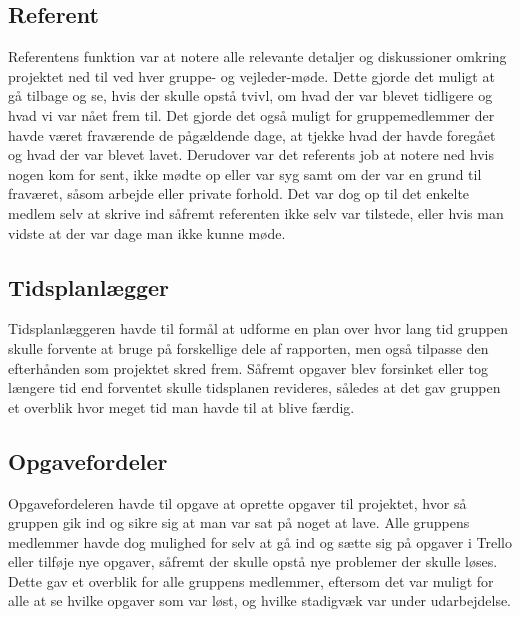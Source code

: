 \subsection{Referent}\label{Referent}
Referentens funktion var at notere alle relevante detaljer og diskussioner omkring projektet ned til ved hver gruppe- og vejleder-møde. Dette gjorde det muligt at gå tilbage og se, hvis der skulle opstå tvivl, om hvad der var blevet tidligere og hvad vi var nået frem til. Det gjorde det også muligt for gruppemedlemmer der havde været fraværende de pågældende dage, at tjekke hvad der havde foregået og hvad der var blevet lavet. Derudover var det referents job at notere ned hvis nogen kom for sent, ikke mødte op eller var syg samt om der var en grund til fraværet, såsom arbejde eller private forhold. Det var dog op til det enkelte medlem selv at skrive ind såfremt referenten ikke selv var tilstede, eller hvis man vidste at der var dage man ikke kunne møde.  

\subsection{Tidsplanlægger}\label{Tidsplanlaegger}
Tidsplanlæggeren havde til formål at udforme en plan over hvor lang tid gruppen skulle forvente at bruge på forskellige dele af rapporten, men også tilpasse den efterhånden som projektet skred frem. Såfremt opgaver blev forsinket eller tog længere tid end forventet skulle tidsplanen revideres, således at det gav gruppen et overblik hvor meget tid man havde til at blive færdig.

\subsection{Opgavefordeler}\label{Opgavefordeler}
Opgavefordeleren havde til opgave at oprette opgaver til projektet, hvor så gruppen gik ind og sikre sig at man var sat på noget at lave. Alle gruppens medlemmer havde dog mulighed for selv at gå ind og sætte sig på opgaver i Trello eller tilføje nye opgaver, såfremt der skulle opstå nye problemer der skulle løses. Dette gav et overblik for alle gruppens medlemmer, eftersom det var muligt for alle at se hvilke opgaver som var løst, og hvilke stadigvæk var under udarbejdelse.

